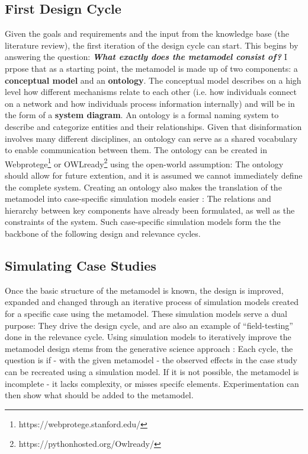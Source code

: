\subsection{First Design Cycle}
Given the goals and requirements and the input from the knowledge base (the literature review), the first iteration of the design cycle can start. This begins by answering the question: \textbf{\textit{What exactly does the metamodel consist of?}} I prpose that as a starting point, the metamodel is made up of two components: a \textbf{conceptual model} and an \textbf{ontology}. The conceptual model describes on a high level how different mechanisms relate to each other (i.e. how individuals connect on a network and how individuals process information internally) and will be in the form of a \textbf{system diagram}. An ontology is a formal naming system to describe and categorize entities and their relationships. Given that disinformation involves many different disciplines, an ontology can serve as a shared vocabulary to enable communication between them. The ontology can be created in Webprotege\footnote{https://webprotege.stanford.edu/} or OWLready\footnote{https://pythonhosted.org/Owlready/} using the open-world assumption: The ontology should allow for future extention, and it is assumed we cannot immediately define the complete system. Creating an ontology also makes the translation of the metamodel into case-specific simulation models easier \citep{Benjamin2006}: The relations and hierarchy between key components have already been formulated, as well as the constraints of the system. Such case-specific simulation models form the the backbone of the following design and relevance cycles.


\subsection{Simulating Case Studies}
Once the basic structure of the metamodel is known, the design is improved, expanded and changed through an iterative process of simulation models created for a specific case using the metamodel. These simulation models serve a dual purpose: They drive the design cycle, and are also an example of ``field-testing''  done in the relevance cycle.
Using simulation models to iteratively improve the metamodel design stems from the generative science approach \cite{Epstein2006}: Each cycle, the question is if - with the given metamodel - the observed effects in the case study can be recreated using a simulation model. If it is not possible, the metamodel is incomplete - it lacks complexity, or misses specifc elements. Experimentation can then show what should be added to the metamodel.\\

